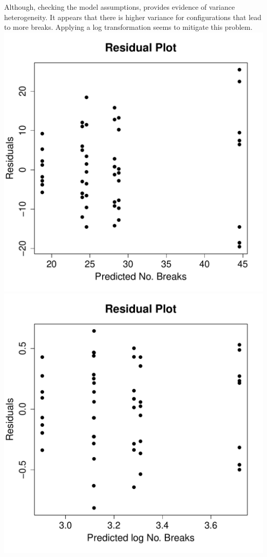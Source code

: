 \documentclass{homework}
\begin{document}
\begin{solution}
Although, checking the model assumptions, provides evidence of
variance heterogeneity.  It appears that there is higher variance for
configurations that lead to more breaks.  Applying a log
transformation seems to mitigate this problem.
\includegraphics[width=.45\textwidth]{wool_resid1.pdf}
\includegraphics[width=.45\textwidth]{wool_resid2.pdf}


\end{solution}
\end{document}
